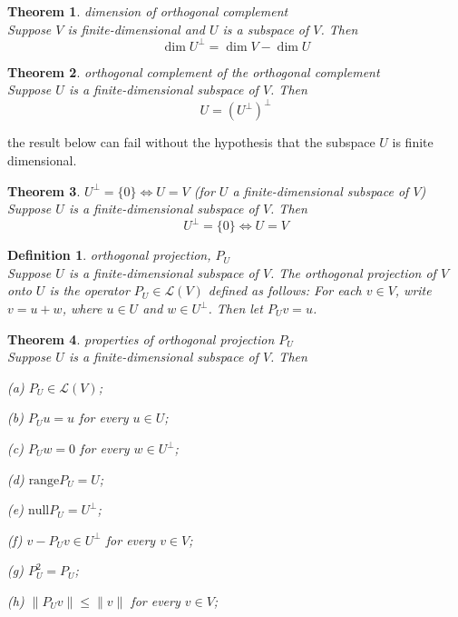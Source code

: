 \documentclass{article}
\newtheorem{theorem}{Theorem}[subsection]
\newtheorem{definition}{Definition}[subsection]
\newcommand{\range}{\text{range}}
\newcommand{\n}{\text{null}}
\begin{document}
\begin{CJK}{UTF8}{gkai}
\begin{theorem}
    dimension of orthogonal complement\\

    Suppose $V$ is finite-dimensional and $U$ is a subspace of $V$. Then
    \[\dim U^\bot = \dim V - \dim U\]
\end{theorem}

\begin{theorem}
    orthogonal complement of the orthogonal complement\\
    Suppose $U$ is a finite-dimensional subspace of $V$. Then
    \[U =(U^\bot)^\bot\]
\end{theorem}
the result below can fail without the hypothesis that the subspace $U$ is finite dimensional.

\begin{theorem}
    $U^\bot =\{0\} \Leftrightarrow U = V$ (for $U$ a finite-dimensional subspace of $V$)\\

    Suppose $U$ is a finite-dimensional subspace of $V$. Then
    \[U^\bot =\{0\} \Leftrightarrow U=V\]
\end{theorem}

\begin{definition}
    orthogonal projection, $P_U$\\

    Suppose $U$ is a finite-dimensional subspace of $V$. The orthogonal projection of $V$ onto $U$ is the operator $P_U \in \mathcal{L}(V)$ defined as follows: For each $v \in V$,
    write $v = u+w$, where $u \in U$ and $w \in U^\bot$. Then let $P_U v = u$.
\end{definition}

\begin{theorem}
    properties of orthogonal projection $P_U$\\

    Suppose $U$ is a finite-dimensional subspace of $V$. Then

    (a) $P_U \in \mathcal{L}(V)$;

    (b) $P_U u = u$ for every $u \in U$;

    (c) $P_Uw = 0$ for every $w \in U^\bot$;

    (d) $\range P_U = U$;

    (e) $\n P_U = U^\bot$;

    (f) $v - P_U v  \in U^\bot$ for every $v \in V$;

    (g) $P_U^2 = P_U$;

    (h) $\|P_Uv\| \leq \|v\|$ for every $v \in V$;


\end{theorem}
\end{CJK}
\end{document}
